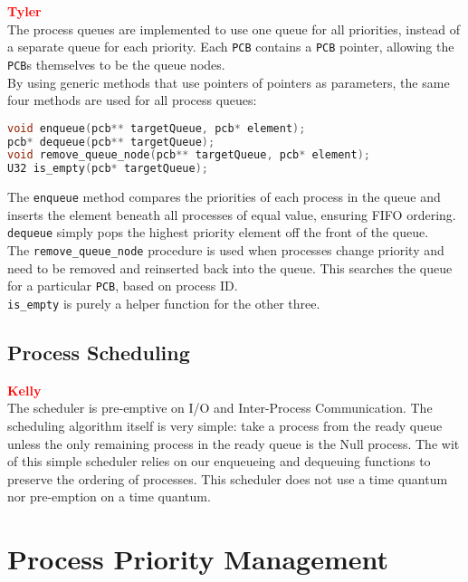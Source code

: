 \documentclass[12pt]{report}
\begin{document}
\textcolor{red}{\textbf{Tyler}} \\
The process queues are implemented to use one queue for all priorities, instead of a separate queue for each priority. Each {\tt PCB} contains a {\tt PCB} pointer, allowing the {\tt PCB}s themselves to be the queue nodes. \\
By using generic methods that use pointers of pointers as parameters, the same four methods are used for all process queues: \\
\begin{minipage}{\textwidth}
\begin{lstlisting}[language=C, frame=single]
void enqueue(pcb** targetQueue, pcb* element);
pcb* dequeue(pcb** targetQueue);
void remove_queue_node(pcb** targetQueue, pcb* element);
U32 is_empty(pcb* targetQueue);
\end{lstlisting}
\end{minipage}
The {\tt enqueue} method compares the priorities of each process in the queue and inserts the element beneath all processes of equal value, ensuring FIFO ordering.\\
{\tt dequeue} simply pops the highest priority element off the front of the queue.\\
The {\tt remove_queue_node} procedure is used when processes change priority and need to be removed and reinserted back into the queue. This searches the queue for a particular {\tt PCB}, based on process ID.\\
{\tt is_empty} is purely a helper function for the other three.\\

\subsection{Process Scheduling}


\textcolor{red}{\textbf{Kelly}} \\
The scheduler is pre-emptive on I/O and Inter-Process Communication.
The scheduling algorithm itself is very simple: take a process from the ready queue
unless the only remaining process in the ready queue is the Null process. The wit of 
this simple scheduler relies on our enqueueing and dequeuing functions to preserve
the ordering of processes. This scheduler does not use a time quantum nor pre-emption
on a time quantum.



\section{Process Priority Management}
\end{document}
